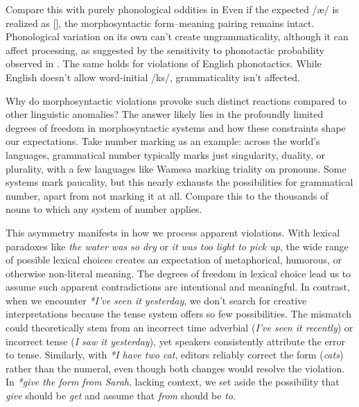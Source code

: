 \documentclass[12pt,letterpaper]{article}
\begin{document}
Compare this with purely phonological oddities in 
\ea
{}
\z
\z
Even if the expected /æ/ is realized as [\textipa{\textsci}], the morphosyntactic form--meaning pairing remains intact. Phonological variation on its own can't create ungrammaticality, although it can affect processing, as suggested by the sensitivity to phonotactic probability observed in \textcite{Regev2024}. The same holds for violations of English phonotactics. While English doesn't allow word-initial /ks/, grammaticality isn't affected.

\bigskip
Why do morphosyntactic violations provoke such distinct reactions compared to other linguistic anomalies? The answer likely lies in the profoundly limited degrees of freedom in morphosyntactic systems and how these constraints shape our expectations. Take number marking as an example: across the world's languages, grammatical number typically marks just singularity, duality, or plurality, with a few languages like Wamesa marking triality on pronouns. Some systems mark paucality, but this nearly exhausts the possibilities for grammatical number, apart from not marking it at all. Compare this to the thousands of nouns to which any system of number applies. 

This asymmetry manifests in how we process apparent violations. With lexical paradoxes like \textit{the water was so dry} or \textit{it was too light to pick up}, the wide range of possible lexical choices creates an expectation of metaphorical, humorous, or otherwise non-literal meaning. The degrees of freedom in lexical choice lead us to assume such apparent contradictions are intentional and meaningful. In contrast, when we encounter \textit{*I've seen it yesterday}, we don't search for creative interpretations because the tense system offers so few possibilities. The mismatch could theoretically stem from an incorrect time adverbial (\textit{I've seen it recently}) or incorrect tense (\textit{I saw it yesterday}), yet speakers consistently attribute the error to tense. Similarly, with \textit{*I have two cat}, editors reliably correct the form (\textit{cats}) rather than the numeral, even though both changes would resolve the violation. In \textit{*give the form from Sarah}, lacking context, we set aside the possibility that \textit{give} should be \textit{get} and assume that \textit{from} should be \textit{to}.
\end{document}
